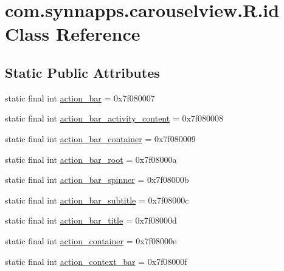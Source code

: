 \hypertarget{classcom_1_1synnapps_1_1carouselview_1_1_r_1_1id}{}\section{com.\+synnapps.\+carouselview.\+R.\+id Class Reference}
\label{classcom_1_1synnapps_1_1carouselview_1_1_r_1_1id}
\subsection*{Static Public Attributes}
\begin{DoxyCompactItemize}
\item 
static final int \mbox{\hyperlink{classcom_1_1synnapps_1_1carouselview_1_1_r_1_1id_acb5d4b88ef7a4e9ce129ef34c335ec38}{action\+\_\+bar}} = 0x7f080007
\item 
static final int \mbox{\hyperlink{classcom_1_1synnapps_1_1carouselview_1_1_r_1_1id_a390ee16971d5a4ccb3564b7f9c5e58d8}{action\+\_\+bar\+\_\+activity\+\_\+content}} = 0x7f080008
\item 
static final int \mbox{\hyperlink{classcom_1_1synnapps_1_1carouselview_1_1_r_1_1id_aacb1f5f5820bc1a826a6102a11a1795f}{action\+\_\+bar\+\_\+container}} = 0x7f080009
\item 
static final int \mbox{\hyperlink{classcom_1_1synnapps_1_1carouselview_1_1_r_1_1id_af9904e3fa4fd2b0c14d17f911ba46c3d}{action\+\_\+bar\+\_\+root}} = 0x7f08000a
\item 
static final int \mbox{\hyperlink{classcom_1_1synnapps_1_1carouselview_1_1_r_1_1id_a1271bc8d5339245af4547a74b5d8ef44}{action\+\_\+bar\+\_\+spinner}} = 0x7f08000b
\item 
static final int \mbox{\hyperlink{classcom_1_1synnapps_1_1carouselview_1_1_r_1_1id_ad170aef3bb32d5519f5d0b492123eccd}{action\+\_\+bar\+\_\+subtitle}} = 0x7f08000c
\item 
static final int \mbox{\hyperlink{classcom_1_1synnapps_1_1carouselview_1_1_r_1_1id_a1c28dc4da501e14c3ca52097b9c4401c}{action\+\_\+bar\+\_\+title}} = 0x7f08000d
\item 
static final int \mbox{\hyperlink{classcom_1_1synnapps_1_1carouselview_1_1_r_1_1id_adeaf0f0d9a191eff0ecb888019a7020d}{action\+\_\+container}} = 0x7f08000e
\item 
static final int \mbox{\hyperlink{classcom_1_1synnapps_1_1carouselview_1_1_r_1_1id_aa0b5ffc0a87b7068bd033f634d75cd9e}{action\+\_\+context\+\_\+bar}} = 0x7f08000f
\item 

\end{DoxyCompactItemize}
